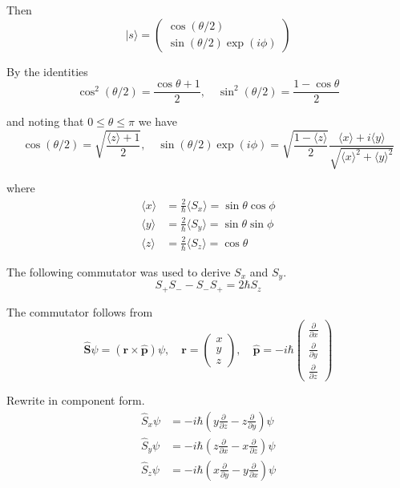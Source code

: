Then
\begin{equation*}
|s\rangle=\begin{pmatrix}\cos(\theta/2)\\\sin(\theta/2)\exp(i\phi)\end{pmatrix}
\end{equation*}

By the identities
\begin{equation*}
\cos^2(\theta/2)=\frac{\cos\theta+1}{2},\quad
\sin^2(\theta/2)=\frac{1-\cos\theta}{2}
\end{equation*}

and noting that $0\le\theta\le\pi$ we have
\begin{equation*}
\cos(\theta/2)=\sqrt{\frac{\langle z\rangle+1}{2}},\quad
\sin(\theta/2)\exp(i\phi)=\sqrt{\frac{1-\langle z\rangle}{2}}
\frac{\langle x\rangle+i\langle y\rangle}{\sqrt{\langle x\rangle^2+\langle y\rangle^2}}
\end{equation*}

where
\begin{align*}
\langle x\rangle&=\tfrac{2}{\hbar}\langle S_x\rangle=\sin\theta\cos\phi
\\
\langle y\rangle&=\tfrac{2}{\hbar}\langle S_y\rangle=\sin\theta\sin\phi
\\
\langle z\rangle&=\tfrac{2}{\hbar}\langle S_z\rangle=\cos\theta
\end{align*}

The following commutator was used to derive $S_x$ and $S_y$.
\begin{equation*}
S_+S_--S_-S_+=2\hbar S_z
\end{equation*}

The commutator follows from
\begin{equation*}
\hat{\mathbf S}\psi=(\mathbf r\times\hat{\mathbf p})\psi,\quad
\mathbf r=\begin{pmatrix}x\\y\\z\end{pmatrix},\quad
\hat{\mathbf p}=-i\hbar\begin{pmatrix}
\frac{\partial}{\partial x}\\[1ex]
\frac{\partial}{\partial y}\\[1ex]
\frac{\partial}{\partial z}
\end{pmatrix}
\end{equation*}

Rewrite in component form.
\begin{align*}
\hat S_x\psi&=-i\hbar\left(y\frac{\partial}{\partial z}-z\frac{\partial}{\partial y}\right)\psi
\\[1ex]
\hat S_y\psi&=-i\hbar\left(z\frac{\partial}{\partial x}-x\frac{\partial}{\partial z}\right)\psi
\\[1ex]
\hat S_z\psi&=-i\hbar\left(x\frac{\partial}{\partial y}-y\frac{\partial}{\partial x}\right)\psi
\end{align*}

